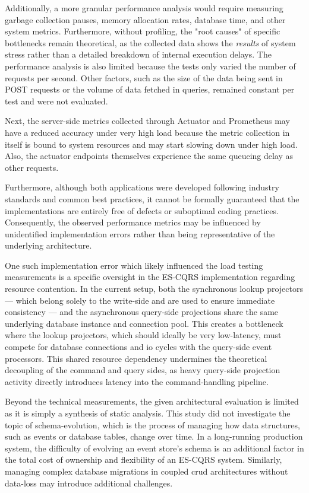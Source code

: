 Additionally, a more granular performance analysis would require measuring garbage collection pauses, memory allocation rates, database time, and other system metrics. Furthermore, without profiling, the "root causes" of specific bottlenecks remain theoretical, as the collected data shows the \emph{results} of system stress rather than a detailed breakdown of internal execution delays. The performance analysis is also limited because the tests only varied the number of requests per second. Other factors, such as the size of the data being sent in POST requests or the volume of data fetched in queries, remained constant per test and were not evaluated.

Next, the server-side metrics collected through Actuator and Prometheus may have a reduced accuracy under very high load because the metric collection in itself is bound to system resources and may start slowing down under high load. Also, the actuator endpoints themselves experience the same queueing delay as other requests.

Furthermore, although both applications were developed following industry standards and common best practices, it cannot be formally guaranteed that the implementations are entirely free of defects or suboptimal coding practices. Consequently, the observed performance metrics may be influenced by unidentified implementation errors rather than being representative of the underlying architecture.

One such implementation error which likely influenced the load testing measurements is a specific oversight in the ES-CQRS implementation regarding resource contention. In the current setup, both the synchronous lookup projectors --- which belong solely to the write-side and are used to ensure immediate consistency --- and the asynchronous query-side projections share the same underlying database instance and connection pool. This creates a bottleneck where the lookup projectors, which should ideally be very low-latency, must compete for database connections and \gls{io} cycles with the query-side event processors. This shared resource dependency undermines the theoretical decoupling of the command and query sides, as heavy query-side projection activity directly introduces latency into the command-handling pipeline.

Beyond the technical measurements, the given architectural evaluation is limited as it is simply a synthesis of static analysis. This study did not investigate the topic of \gls{schema-evolution}, which is the process of managing how data structures, such as events or database tables, change over time. In a long-running production system, the difficulty of evolving an event store's schema is an additional factor in the total cost of ownership and flexibility of an ES-CQRS system. Similarly, managing complex database migrations in coupled \gls{crud} architectures without data-loss may introduce additional challenges.


